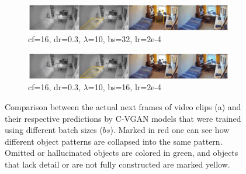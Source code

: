 \begin{figure}
	\begin{subfigure}{\textwidth}
		\centering
		\includegraphics[width=\textwidth]{graphics/eval/cvgan_2/qual_basic/dfilter-16_ddropout-0.3_lambda-10_batchsize-32_learningrate-0.0002/predicted.pdf}
	  \caption{cf=16, dr=0.3, $\lambda$=10, bs=32, lr=2e-4}
	  \label{subfig:bs32-comp-2}
	\end{subfigure}

	\begin{subfigure}{\textwidth}
		\centering
		\includegraphics[width=\textwidth]{graphics/eval/cvgan_2/qual_basic/dfilter-16_ddropout-0.3_lambda-10_batchsize-16_learningrate-0.0002/predicted.pdf}
	  \caption{cf=16, dr=0.3, $\lambda$=10, bs=16, lr=2e-4}
	  \label{subfig:bs16-comp-2}
	\end{subfigure}
	
	\caption[Qualitative comparison between different C-VGAN models. (2)]{Comparison between the actual next frames of video clips (a) and their respective predictions by C-VGAN models that were trained using different batch sizes ($bs$). Marked in red one can see how different object patterns are collapsed into the same pattern. Omitted or hallucinated objects are colored in green, and objects that lack detail or are not fully constructed are marked yellow.}
	\label{fig:cvgan_comparison_bs}
\end{figure}

